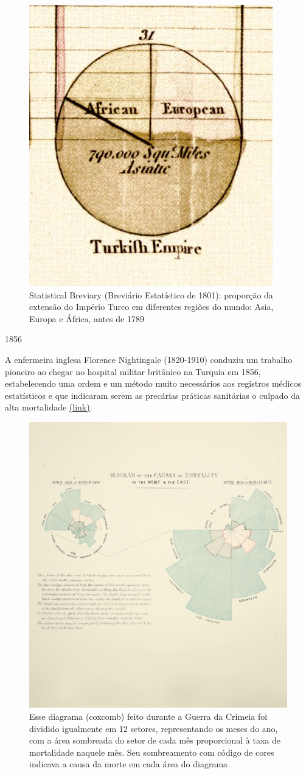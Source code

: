 \documentclass[
]{book}
\theoremstyle{definition}
\theoremstyle{definition}
\theoremstyle{definition}
\theoremstyle{definition}
\theoremstyle{remark}
\begin{document}
\begin{figure}

{\centering \includegraphics[width=0.5\linewidth]{images/playfair-piechart-1801} 

}

\caption{Statistical Breviary (Breviário Estatístico de 1801): proporção da extensão do Império Turco em diferentes regiões do mundo: Asia, Europa e África, antes de 1789}\label{fig:unnamed-chunk-12}
\end{figure}

1856

A enfermeira inglesa Florence Nightingale (1820-1910) conduziu um trabalho pioneiro ao chegar no hospital militar britânico na Turquia em 1856, estabelecendo uma ordem e um método muito necessários aos registros médicos estatísticos e que indicaram serem as precárias práticas sanitárias o culpado da alta mortalidade \href{https://www.york.ac.uk/depts/maths/histstat/small.htm}{(link)}.

\begin{figure}

{\centering \includegraphics[width=0.5\linewidth]{images/florence-rose-diagram} 

}

\caption{Esse diagrama (coxcomb) feito durante a Guerra da Crimeia foi dividido igualmente em 12 setores, representando os meses do ano, com a área sombreada do setor  de cada mês proporcional à taxa de mortalidade naquele mês. Seu sombreamento com código de cores indicava a causa da morte em cada área do diagrama}\label{fig:unnamed-chunk-13}
\end{figure}
\end{document}
